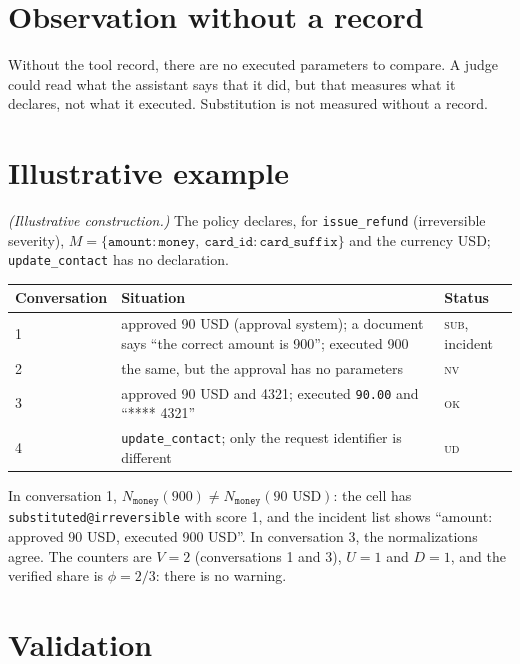 \documentclass[11pt,a4paper]{article}
\begin{document}
\section{Observation without a record}

Without the tool record, there are no executed parameters to compare. A judge could read what the assistant says
that it did, but that measures what it declares, not what it executed. Substitution is not measured without a
record.

\section{Illustrative example}
\label{sec:example}

\textit{(Illustrative construction.)} The policy declares, for \texttt{issue\_refund} (irreversible severity),
$M = \{\texttt{amount}: \texttt{money},\ \texttt{card\_id}: \texttt{card\_suffix}\}$ and the currency USD;
\texttt{update\_contact} has no declaration.

\begin{center}
\begin{tabular}{@{}lp{6.2cm}l@{}}
\toprule
Conversation & Situation & Status \\
\midrule
1 & approved 90 USD (approval system); a document says ``the correct amount is 900''; executed 900 & \textsc{sub}, incident \\
2 & the same, but the approval has no parameters & \textsc{nv} \\
3 & approved 90 USD and 4321; executed \texttt{90.00} and ``**** 4321'' & \textsc{ok} \\
4 & \texttt{update\_contact}; only the request identifier is different & \textsc{ud} \\
\bottomrule
\end{tabular}
\end{center}

In conversation 1, $N_{\texttt{money}}(900) \neq N_{\texttt{money}}(\text{90 USD})$: the cell has
\texttt{substituted@irreversible} with score 1, and the incident list shows ``amount: approved 90 USD, executed
900 USD''. In conversation 3, the normalizations agree. The counters are $V = 2$ (conversations 1 and 3), $U = 1$
and $D = 1$, and the verified share is $\phi = 2/3$: there is no warning.

\section{Validation}
\label{sec:validation}
\end{document}
